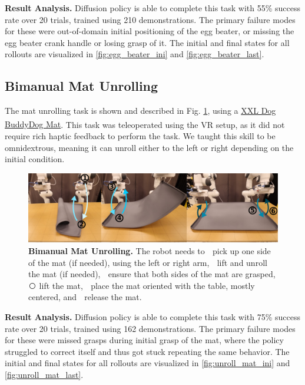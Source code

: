 \documentclass[Afour,sageh,times]{sagej}
\newcommand{\legalTM}{\textsuperscript{\texttrademark}}
\begin{document}
\textbf{Result Analysis.} Diffusion policy is able to complete this task with 55\% success rate over 20 trials, trained using 210 demonstrations. The primary failure modes for these were out-of-domain initial positioning of the egg beater, or missing the egg beater crank handle or losing grasp of it. The initial and final states for all rollouts are visualized in \ref{fig:egg_beater_ini} and \ref{fig:egg_beater_last}.



\subsection{Bimanual Mat Unrolling}

The mat unrolling task is shown and described in Fig. \ref{fig:real_unroll_mat}, using a
\href{https://www.amazon.com/DogBuddy-Dog-Food-Mat-Waterproof/dp/B08GGDNB71}{XXL Dog Buddy\legalTM Dog Mat}.
This task was teleoperated using the VR setup, as it did not require rich haptic feedback to perform the task. We taught this skill to be omnidextrous, meaning it can unroll either to the left or right depending on the initial condition.

\begin{figure}[t]
\centering
\includegraphics[width=\linewidth]{figure/real_unroll_mat_setup_compressed.pdf}
\caption{\textbf{Bimanual Mat Unrolling. } 
\label{fig:real_unroll_mat}
The robot needs to
\textcircled{} pick up one side of the mat (if needed), using the left or right arm,
\textcircled{} lift and unroll the mat (if needed),
\textcircled{} ensure that both sides of the mat are grasped,
\textcircled{} lift the mat,
\textcircled{} place the mat oriented with the table, mostly centered, and
\textcircled{} release the mat.
}
\vspace{-4mm}
\end{figure}

\textbf{Result Analysis.} Diffusion policy is able to complete this task with 75\% success rate over 20 trials, trained using 162 demonstrations. The primary failure modes for these were missed grasps during initial grasp of the mat, where the policy struggled to correct itself and thus got stuck repeating the same behavior. The initial and final states for all rollouts are visualized in \ref{fig:unroll_mat_ini} and \ref{fig:unroll_mat_last}.
\end{document}
